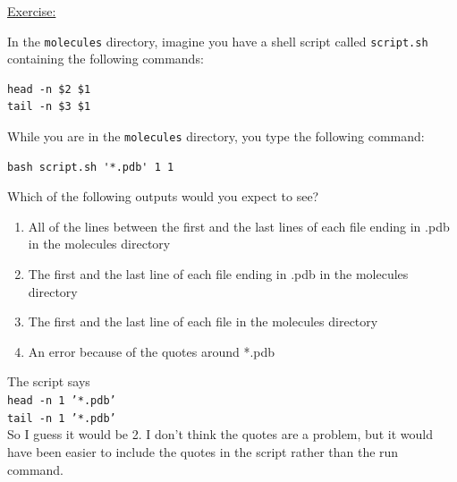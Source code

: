 \documentclass[12pt]{article}
\begin{document}
\begin{addmargin}[1cm]{0cm}
\color{gray}
\underline{Exercise:}

In the \texttt{molecules} directory, imagine you have a shell script called \texttt{script.sh} containing the following commands:

\vspace{-1em}\begin{verbatim}
head -n $2 $1
tail -n $3 $1
\end{verbatim}\vspace{-1em}
While you are in the \texttt{molecules} directory, you type the following command:
\vspace{-1em}\begin{verbatim}
bash script.sh '*.pdb' 1 1
\end{verbatim}\vspace{-1em}
Which of the following outputs would you expect to see?

\begin{enumerate}\vspace{-0.5em}
\item All of the lines between the first and the last lines of each file ending in .pdb in the molecules directory
\item The first and the last line of each file ending in .pdb in the molecules directory
\item The first and the last line of each file in the molecules directory
\item An error because of the quotes around *.pdb
\end{enumerate}

\color{black}\vspace{-0.5em}
The script says 
\\\texttt{head -n 1 '*.pdb'}
\\\texttt{tail -n 1 '*.pdb'}
\\So I guess it would be 2. I don't think the quotes are a problem, but it would have been easier to include the quotes in the script rather than the run command.
\end{addmargin}
\end{document}
